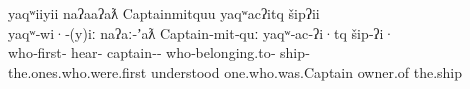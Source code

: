 \begin{exe}
  \glllll yaqʷiiyii     naʔaaʔaƛ Captainmitquu       yaqʷacʔitq        šipʔii\\
          yaqʷ‑wi·‑(y)iː          naʔaː‑ʼaƛ          Captain‑mit‑quː               yaqʷ‑ac‑ʔi·tq               šip‑ʔi·\\
          who‑first‑  hear‑      captain‑‑ who‑belonging.to‑ ship‑\\
          the.ones.who.were.first understood         one.who.was.Captain           owner.of                    the.ship\\
          { }                                                    { }                         \\
          \vfix

  \parencite[Kingfisher]{Louie2003}
  \renewcommand{\eachwordfive}{\rmfamily}

\end{exe}

